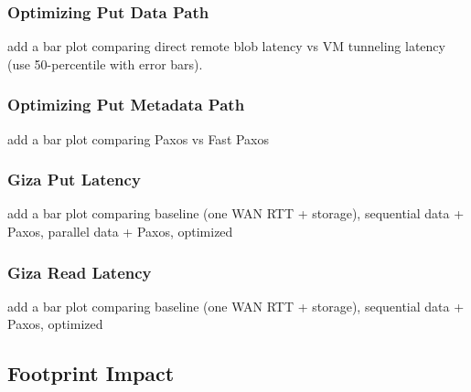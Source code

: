 \subsubsection{Optimizing Put Data Path}

add a bar plot comparing direct remote blob latency vs VM tunneling latency (use 50-percentile with error bars).

\subsubsection{Optimizing Put Metadata Path}

add a bar plot comparing Paxos vs Fast Paxos

\subsubsection{Giza Put Latency}

add a bar plot comparing baseline (one WAN RTT + storage), sequential data + Paxos, parallel data + Paxos, optimized

\subsubsection{Giza Read Latency}

add a bar plot comparing baseline (one WAN RTT + storage), sequential data + Paxos, optimized


\subsection{Footprint Impact}

